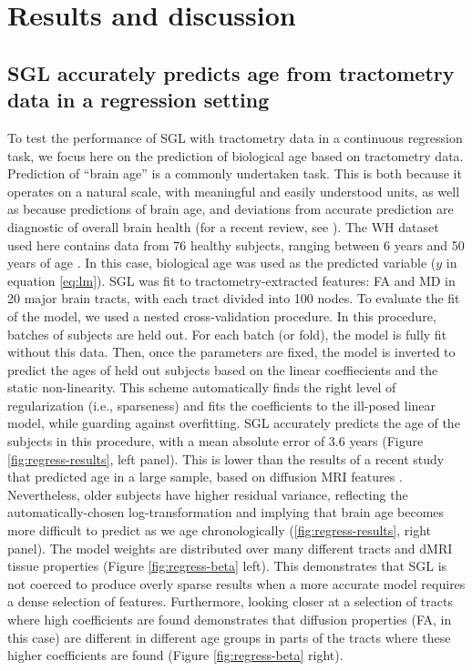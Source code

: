 \section*{Results and discussion}

\subsection*{SGL accurately predicts age from tractometry data in a regression setting}

To test the performance of SGL with tractometry data in a continuous regression
task, we focus here on the prediction of biological age based on tractometry
data. Prediction of ``brain age'' is a commonly undertaken task. This is both
because it operates on a natural scale, with meaningful and easily understood
units, as well as because predictions of brain age, and deviations from accurate
prediction are diagnostic of overall brain health (for a recent review, see
\cite{Cole2019-rz}). The WH dataset used here contains data from 76 healthy
subjects, ranging between 6 years and 50 years of age
\cite{yeatman2014lifespan}. In this case, biological age was used as the
predicted variable ($y$ in equation \ref{eq:lm}). SGL was fit to
tractometry-extracted features: FA and MD in 20 major brain tracts, with each
tract divided into 100 nodes. To evaluate the fit of the model, we used a nested
cross-validation procedure. In this procedure, batches of subjects are held out.
For each batch (or fold), the model is fully fit without this data. Then, once
the parameters are fixed, the model is inverted to predict the ages of held out
subjects based on the linear coeffiecients and the static non-linearity. This
scheme automatically finds the right level of regularization (i.e., sparseness)
and fits the coefficients to the ill-posed linear model, while guarding against
overfitting. SGL accurately predicts the age of the subjects in this procedure,
with a mean absolute error of 3.6 years (Figure \ref{fig:regress-results}, left
panel). This is lower than the results of a recent study that predicted age in a
large sample, based on diffusion MRI features \cite{Richard2018-ux}.
Nevertheless, older subjects have higher residual variance, reflecting the
automatically-chosen log-transformation and implying that brain age becomes more
difficult to predict as we age chronologically (\ref{fig:regress-results}, right
panel). The model weights are distributed over many different tracts and dMRI
tissue properties (Figure \ref{fig:regress-beta} left). This demonstrates that
SGL is not coerced to produce overly sparse results when a more accurate model
requires a dense selection of features. Furthermore, looking closer at a
selection of tracts where high coefficients are found demonstrates that
diffusion properties (FA, in this case) are different in different age groups in
parts of the tracts where these higher coefficients are found (Figure
\ref{fig:regress-beta} right).


